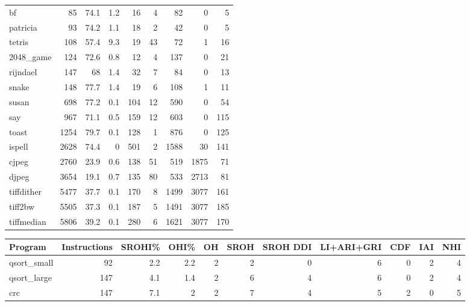 \begin{tabular}{lrrrrrrrr}
 bf              &       85 &     74.1 &    1.2 &   16 &    4 &     82 &     0 &     5 \\
 patricia        &       93 &     74.2 &    1.1 &   18 &    2 &     42 &     0 &     5 \\
 tetris          &      108 &     57.4 &    9.3 &   19 &   43 &     72 &     1 &    16 \\
 2048\_game       &      124 &     72.6 &    0.8 &   12 &    4 &    137 &     0 &    21 \\
 rijndael        &      147 &     68   &    1.4 &   32 &    7 &     84 &     0 &    13 \\
 snake           &      148 &     77.7 &    1.4 &   19 &    6 &    108 &     1 &    11 \\
 susan           &      698 &     77.2 &    0.1 &  104 &   12 &    590 &     0 &    54 \\
 say             &      967 &     71.1 &    0.5 &  159 &   12 &    603 &     0 &   115 \\
 toast           &     1254 &     79.7 &    0.1 &  128 &    1 &    876 &     0 &   125 \\
 ispell          &     2628 &     74.4 &    0   &  501 &    2 &   1588 &    30 &   141 \\
 cjpeg           &     2760 &     23.9 &    0.6 &  138 &   51 &    519 &  1875 &    71 \\
 djpeg           &     3654 &     19.1 &    0.7 &  135 &   80 &    533 &  2713 &    81 \\
 tiffdither      &     5477 &     37.7 &    0.1 &  170 &    8 &   1499 &  3077 &   161 \\
 tiff2bw         &     5505 &     37.3 &    0.1 &  187 &    5 &   1491 &  3077 &   185 \\
 tiffmedian      &     5806 &     39.2 &    0.1 &  280 &    6 &   1621 &  3077 &   170 \\
\hline
\end{tabular}\begin{tabular}{lrrrrrrrrrr}
\hline
 Program         &   Instructions &   SROHI\% &   OHI\% &   OH &   SROH &   SROH DDI &   LI+ARI+GRI &   CDF &   IAI &   NHI \\
\hline
 qsort\_small     &             92 &      2.2 &    2.2 &    2 &      2 &          0 &            6 &     0 &     2 &     4 \\
 qsort\_large     &            147 &      4.1 &    1.4 &    2 &      6 &          4 &            6 &     0 &     2 &     4 \\
 crc             &            147 &      7.1 &    2   &    2 &      7 &          4 &            5 &     2 &     0 &     5 \\

\end{tabular}
